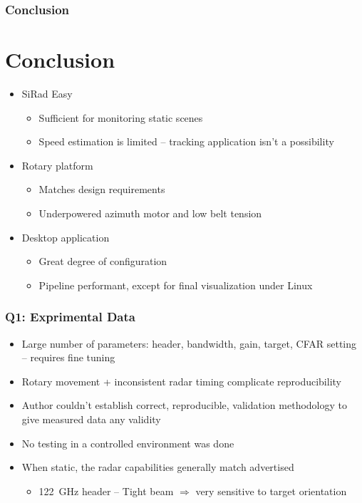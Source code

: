 \documentclass[aspectratio=169]{beamer}
\begin{document}
\begin{frame}[fragile]
  \frametitle{Conclusion}
  \section{Conclusion}
  \begin{itemize}
    \item SiRad Easy
      \begin{itemize}
				\item Sufficient for monitoring static scenes
        \item Speed estimation is limited -- tracking application isn't a possibility
      \end{itemize}
    \item Rotary platform
      \begin{itemize}
        \item Matches design requirements
        \item Underpowered azimuth motor and low belt tension
      \end{itemize}
    \item Desktop application
      \begin{itemize}
        \item Great degree of configuration
        \item Pipeline performant, except for final visualization under Linux
      \end{itemize}
  \end{itemize}
\end{frame}



\begin{frame}[fragile]
  \frametitle{Q1: Exprimental Data}

  \begin{itemize}
    \item Large number of parameters: header, bandwidth, gain, target, CFAR setting -- requires fine tuning
    \item Rotary movement + inconsistent radar timing complicate reproducibility
    \item Author couldn't establish correct, reproducible, validation methodology to give measured data any validity
    \item No testing in a controlled environment was done
    \item When static, the radar capabilities generally match advertised
      \begin{itemize}
        \item 122~GHz header -- Tight beam $\Rightarrow$ very sensitive to target orientation
      \end{itemize}
  \end{itemize}
\end{frame}
\end{document}

